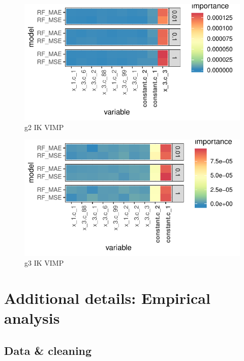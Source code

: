 \documentclass{article}
\begin{document}
\begin{figure}
	\includegraphics[]{../../Results/simulation/graphics/simulation_g2_vimp_ik.pdf}
	\caption{g2 IK VIMP}
\end{figure}

\begin{figure}
	\includegraphics[]{../../Results/simulation/graphics/simulation_g3_vimp_ik.pdf}
	\caption{g3 IK VIMP}
\end{figure}

\newpage

\appendix

\section{Additional details: Empirical analysis}

\subsection{Data \& cleaning}
\end{document}
